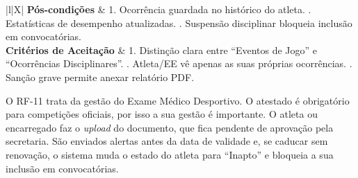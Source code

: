 {\begin{xltabular}{\textwidth}{|l|X|}
\textbf{Pós-condições} & 1. Ocorrência guardada no histórico do atleta. . Estatísticas de desempenho atualizadas. . Suspensão disciplinar bloqueia inclusão em convocatórias. \\ \hline
\textbf{Critérios de Aceitação} & 1. Distinção clara entre ``Eventos de Jogo'' e ``Ocorrências Disciplinares''. . Atleta/EE vê apenas as suas próprias ocorrências. . Sanção grave permite anexar relatório PDF. \\
\end{xltabular}
}


O RF-11 trata da gestão do Exame Médico Desportivo. O atestado é obrigatório para competições oficiais, por isso a sua gestão é importante. O atleta ou encarregado faz o \textit{upload} do documento, que fica pendente de aprovação pela secretaria. São enviados alertas antes da data de validade e, se caducar sem renovação, o sistema muda o estado do atleta para ``Inapto'' e bloqueia a sua inclusão em convocatórias.

